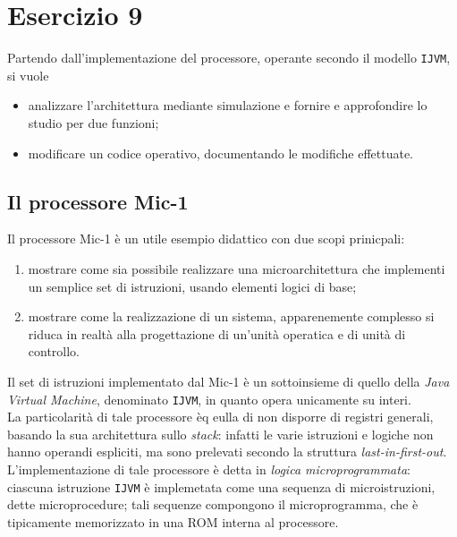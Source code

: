 \chapter{Esercizio 9}
Partendo dall'implementazione del processore, operante secondo il modello \texttt{IJVM}, si vuole
\begin{itemize}
    \item analizzare l'architettura mediante simulazione e fornire e approfondire lo studio per due funzioni; 
    \item modificare un codice operativo, documentando le modifiche effettuate.
\end{itemize}

\section{Il processore Mic-1}
Il processore Mic-1 è un utile esempio didattico con due scopi prinicpali:
\begin{enumerate}
    \item mostrare come sia possibile realizzare una microarchitettura che implementi un semplice set di istruzioni, usando elementi logici di base;
    \item mostrare come la realizzazione di un sistema, apparenemente complesso si  riduca in realtà alla progettazione di un'unità operatica e di unità di controllo.
\end{enumerate}

\noindent Il set di istruzioni implementato dal Mic-1 è un sottoinsieme di quello della \textit{Java Virtual Machine}, 
denominato \texttt{IJVM}, in quanto opera unicamente su interi.\\
La particolarità di tale processore èq eulla di non disporre di registri generali, basando la sua architettura sullo \textit{stack}:
infatti le varie istruzioni e logiche non hanno operandi espliciti, ma sono prelevati secondo la struttura \textit{last-in-first-out}.\\
L'implementazione di tale processore è detta in \textit{logica microprogrammata}: ciascuna 
istruzione \texttt{IJVM} è implemetata come una sequenza di microistruzioni, dette microprocedure; tali sequenze compongono il microprogramma, 
che è tipicamente memorizzato in una ROM interna al processore.


